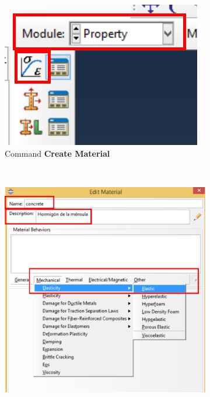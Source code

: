 \begin{enumerate}
\begin{figure}[H]
  \centering
  \begin{subfigure}{0.19\textwidth}
    \includegraphics[width=\textwidth]{./body/images/imagen13.pdf}
    \caption{Command \textbf{Create Material}}
    \label{figu13}
  \end{subfigure}%
  ~ %
  \begin{subfigure}{0.39\textwidth}
    \includegraphics[width=\textwidth]{./body/images/imagen14.pdf}

\end{subfigure}
\end{figure}
\end{enumerate}
